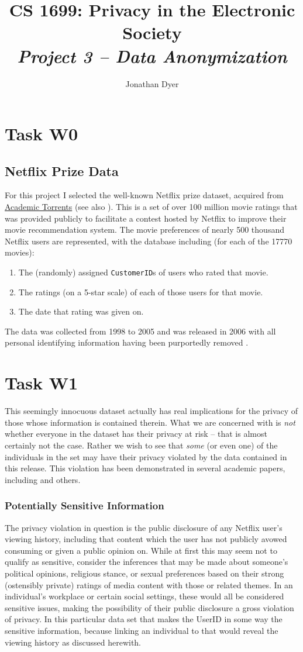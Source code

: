 \documentclass{article}
\author{Jonathan Dyer}
\title{CS 1699: Privacy in the Electronic Society \\
        \textit{Project 3 -- Data Anonymization}}
\providecommand{\task}[1]{\section{Task #1}}
\providecommand{\inlinecode}{\texttt}
\begin{document}
\maketitle

\tableofcontents

\pagebreak

\task{W0}
\subsection{Netflix Prize Data}
For this project I selected the well-known Netflix prize dataset, acquired from \href{http://academictorrents.com/details/9b13183dc4d60676b773c9e2cd6de5e5542cee9a}{Academic Torrents} (see also \cite{NetflixData}). This is a set of over 100 million movie ratings that was provided publicly to facilitate a contest hosted by Netflix to improve their movie recommendation system. The movie preferences of nearly 500 thousand Netflix users are represented, with the database including (for each of the 17770 movies):
\begin{enumerate}
  \item The (randomly) assigned \inlinecode{CustomerID}s of users who rated that movie.
  \item The ratings (on a 5-star scale) of each of those users for that movie.
  \item The date that rating was given on.
\end{enumerate}
The data was collected from 1998 to 2005 and was released in 2006 with all personal identifying information having been purportedly removed \cite{NetflixFAQ}.

\task{W1}
This seemingly innocuous dataset actually has real implications for the privacy of those whose information is contained therein.
What we are concerned with is \textit{not} whether everyone in the dataset has their privacy at risk -- that is almost certainly not the case. Rather we wish to see that \textit{some} (or even one) of the individuals in the set may have their privacy violated by the data contained in this release. This violation has been demonstrated in several academic papers, including \cite{narayanan2006break} and others.

\subsubsection{Potentially Sensitive Information}
The privacy violation in question is the public disclosure of any Netflix user's viewing history, including that content which the user has not publicly avowed consuming or given a public opinion on. While at first this may seem not to qualify as sensitive, consider the inferences that may be made about someone's political opinions, religious stance, or sexual preferences based on their strong (ostensibly private) ratings of media content with those or related themes. In an individual's workplace or certain social settings, these would all be considered sensitive issues, making the possibility of their public disclosure a gross violation of privacy. In this particular data set that makes the UserID in some way the sensitive information, because linking an individual to that would reveal the viewing history as discussed herewith.
\end{document}
